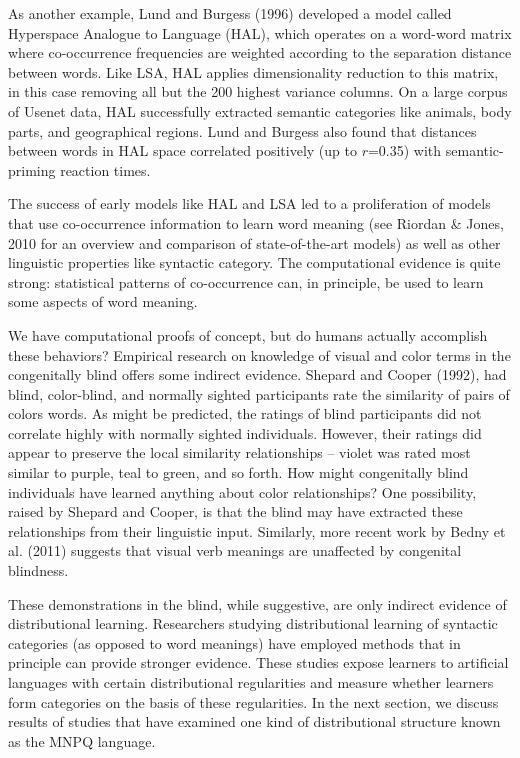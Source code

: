 \documentclass[man,floatsintext]{apa6}
\begin{document}
As another example, Lund and Burgess (1996) developed a model called
Hyperspace Analogue to Language (HAL), which operates on a word-word
matrix where co-occurrence frequencies are weighted according to the
separation distance between words. Like LSA, HAL applies
dimensionality reduction to this matrix, in this case removing all but
the 200 highest variance columns. On a large corpus of Usenet data,
HAL successfully extracted semantic categories like animals, body
parts, and geographical regions. Lund and Burgess also found that
distances between words in HAL space correlated positively (up to
$r$=0.35) with semantic-priming reaction times.

The success of early models like HAL and LSA led to a proliferation of
models that use co-occurrence information to learn word meaning (see
Riordan \& Jones, 2010 for an overview and comparison of
state-of-the-art models) as well as other linguistic properties like
syntactic category. The computational evidence is quite strong:
statistical patterns of co-occurrence can, in principle, be used to
learn some aspects of word meaning.

We have computational proofs of concept, but do humans actually
accomplish these behaviors? Empirical research on knowledge of visual
and color terms in the congenitally blind offers some indirect
evidence. Shepard and Cooper (1992), had blind, color-blind, and
normally sighted participants rate the similarity of pairs of colors
words. As might be predicted, the ratings of blind participants did
not correlate highly with normally sighted individuals. However, their
ratings did appear to preserve the local similarity relationships --
violet was rated most similar to purple, teal to green, and so
forth. How might congenitally blind individuals have learned anything
about color relationships? One possibility, raised by Shepard and
Cooper, is that the blind may have extracted these relationships from
their linguistic input. Similarly, more recent work by Bedny et
al. (2011) suggests that visual verb meanings are unaffected by
congenital
blindness. %

These demonstrations in the blind, while suggestive, are only indirect
evidence of distributional learning. Researchers studying
distributional learning of syntactic categories (as opposed to word
meanings) have employed methods that in principle can provide stronger
evidence. These studies expose learners to artificial languages with
certain distributional regularities and measure whether learners form
categories on the basis of these regularities. In the next section, we
discuss results of studies that have examined one kind of
distributional structure known as the MNPQ language.
\end{document}
